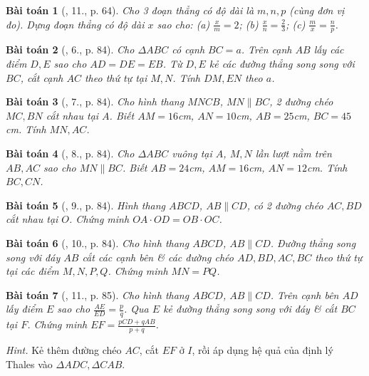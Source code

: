 \documentclass{article}
\newtheorem{baitoan}{Bài toán}
\begin{document}
\begin{baitoan}[\cite{SGK_Toan_8_tap_2}, 11., p. 64]
	Cho 3 đoạn thẳng có độ dài là $m,n,p$ (cùng đơn vị đo). Dựng đoạn thẳng có độ dài $x$ sao cho: (a) $\frac{x}{m} = 2$; (b) $\frac{x}{n} = \frac{2}{3}$; (c) $\frac{m}{x} = \frac{n}{p}$.
\end{baitoan}

\begin{baitoan}[\cite{SBT_Toan_8_tap_2}, 6., p. 84]
	Cho $\Delta ABC$ có cạnh $BC = a$. Trên cạnh $AB$ lấy các điểm $D,E$ sao cho $AD = DE = EB$. Từ $D,E$ kẻ các đường thẳng song song với $BC$, cắt cạnh $AC$ theo thứ tự tại $M,N$. Tính $DM,EN$ theo $a$.	
\end{baitoan}

\begin{baitoan}[\cite{SBT_Toan_8_tap_2}, 7., p. 84]
	Cho hình thang $MNCB$, $MN\parallel BC$, 2 đường chéo $MC,BN$ cắt nhau tại $A$. Biết $AM = 16$\emph{cm}, $AN = 10$\emph{cm}, $AB = 25$\emph{cm}, $BC = 45$\emph{cm}. Tính $MN,AC$.
\end{baitoan}

\begin{baitoan}[\cite{SBT_Toan_8_tap_2}, 8., p. 84]
	Cho $\Delta ABC$ vuông tại $A$, $M,N$ lần lượt nằm trên $AB,AC$ sao cho $MN\parallel BC$. Biết $AB = 24$\emph{cm}, $AM = 16$\emph{cm}, $AN = 12$\emph{cm}. Tính $BC,CN$.
\end{baitoan}

\begin{baitoan}[\cite{SBT_Toan_8_tap_2}, 9., p. 84]
	Hình thang $ABCD$, $AB\parallel CD$, có 2 đường chéo $AC,BD$ cắt nhau tại $O$. Chứng minh $OA\cdot OD = OB\cdot OC$.
\end{baitoan}

\begin{baitoan}[\cite{SBT_Toan_8_tap_2}, 10., p. 84]
	Cho hình thang $ABCD$, $AB\parallel CD$. Đường thẳng song song với đáy $AB$ cắt các cạnh bên \& các đường chéo $AD,BD,AC,BC$ theo thứ tự tại các điểm $M,N,P,Q$. Chứng minh $MN = PQ$.
\end{baitoan}

\begin{baitoan}[\cite{SBT_Toan_8_tap_2}, 11., p. 85]
	Cho hình thang $ABCD$, $AB\parallel CD$. Trên cạnh bên $AD$ lấy điểm $E$ sao cho $\frac{AE}{ED} = \frac{p}{q}$. Qua $E$ kẻ đường thẳng song song với đáy \& cắt $BC$ tại $F$. Chứng minh $EF = \frac{pCD + qAB}{p + q}$.
\end{baitoan}
\noindent\textit{Hint.} Kẻ thêm đường chéo $AC$, cắt $EF$ ở $I$, rồi áp dụng hệ quả của định lý Thales vào $\Delta ADC,\Delta CAB$.
\end{document}
